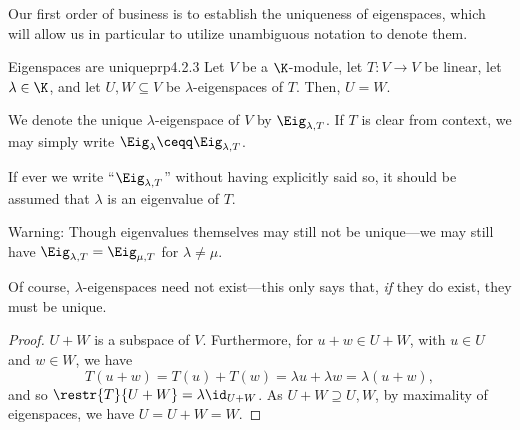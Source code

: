 Our first order of business is to establish the uniqueness of eigenspaces, which will allow us in particular to utilize unambiguous notation to denote them.
\begin{prp}{Eigenspaces are unique}{prp4.2.3}
	Let $V$ be a $\K$-module, let $T\colon V\rightarrow V$ be linear, let $\lambda \in \K$, and let $U,W\subseteq V$ be $\lambda$-eigenspaces of $T$.  Then, $U=W$.
	\begin{rmk}
		We denote the unique $\lambda$-eigenspace of $V$ by $\Eig _{\lambda ,T}$.  If $T$ is clear from context, we may simply write $\Eig _{\lambda}\ceqq \Eig _{\lambda ,T}$.
	\end{rmk}
	\begin{rmk}
		If ever we write ``$\Eig _{\lambda ,T}$'' without having explicitly said so, it should be assumed that $\lambda$ is an eigenvalue of $T$.
	\end{rmk}
	\begin{rmk}
		Warning:  Though eigenvalues themselves may still not be unique---we may still have $\Eig _{\lambda ,T}=\Eig _{\mu ,T}$ for $\lambda \neq \mu$.
	\end{rmk}
	\begin{rmk}
		Of course, $\lambda$-eigenspaces need not exist---this only says that, \emph{if} they do exist, they must be unique.
	\end{rmk}
	\begin{proof}
		$U+W$ is a subspace of $V$.  Furthermore, for $u+w\in U+W$, with $u\in U$ and $w\in W$, we have
		\begin{equation}
			T(u+w)=T(u)+T(w)=\lambda u+\lambda w=\lambda (u+w),
		\end{equation}
		and so $\restr{T}{U+W}=\lambda \id _{U+W}$.  As $U+W\supseteq U,W$, by maximality of eigenspaces, we have $U=U+W=W$.
	\end{proof}
\end{prp}
